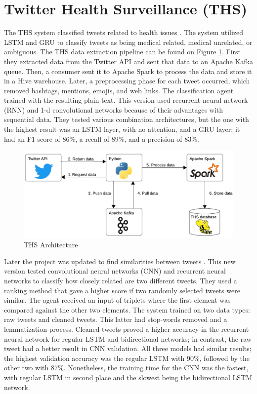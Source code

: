 \section{Twitter Health Surveillance (THS)}
The THS system classified tweets related to health issues \cite{8622504}. The system utilized LSTM and GRU to classify tweets as being medical related, medical unrelated, or ambiguous.  The THS
data extraction pipeline can be found on Figure \ref{ths_architecture}. First they extracted data from the Twitter API and sent that data to an Apache Kafka queue. Then, a consumer sent it to Apache Spark
to process the data and store it in a Hive warehouse. Later, a preprocessing phase for each tweet occurred, which removed hashtags, mentions, emojis, and web links. The classification agent trained with the resulting
plain text. This version used recurrent neural network (RNN) and 1-d convolutional networks because of their advantages with sequential data. They tested various combination architectures, but the one with the highest result was an
LSTM layer, with no attention, and a GRU layer; it had an F1 score of 86\%, a recall of 89\%, and a precision of 83\%.  
 
  \begin{figure}[!h]
    \centering
        \includegraphics[width=1\linewidth]{images/ths_architecture.png}
        \caption{THS Architecture}
        \label{ths_architecture}
\end{figure}

 
Later the project was updated to find similarities between tweets \cite{9581175}. This new version tested convolutional neural networks (CNN) and recurrent neural networks to classify how closely related are two different tweets.
They used a ranking method that gave a higher score if two randomly selected tweets were similar. The agent received an input of triplets where the first element was compared against the other two elements.
The system trained on two data types: raw tweets and cleaned tweets. This latter had stop-words removed and a lemmatization process. Cleaned tweets proved a higher accuracy in the recurrent neural network
for regular LSTM and bidirectional networks; in contrast, the raw tweet had a better result in CNN validation. All three models had similar results; the highest validation accuracy was the regular LSTM with 90\%,
followed by the other two with 87\%. Nonetheless, the training time for the CNN was the fastest, with regular LSTM in second place and the slowest being the bidirectional LSTM network. 



